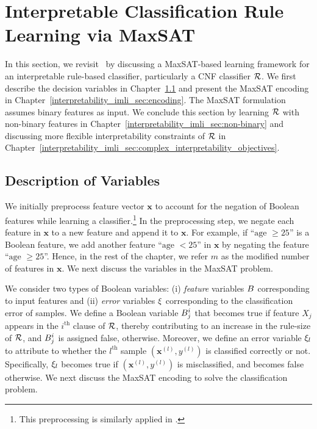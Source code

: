 \section{Interpretable Classification Rule Learning via MaxSAT}
\label{interpretability_imli_sec:baseline}
In this section, we revisit~\cite{malioutov2018mlic} by discussing a MaxSAT-based learning framework for an interpretable rule-based classifier, particularly a CNF classifier $ {\mathcal{R}} $. 
We first describe the decision variables in Chapter~\ref{interpretability_imli_sec:variables} and present the MaxSAT encoding  in Chapter~\ref{interpretability_imli_sec:encoding}. The MaxSAT formulation assumes binary features as input. We
conclude this section by learning $ {\mathcal{R}} $ with non-binary features in Chapter~\ref{interpretability_imli_sec:non-binary} and discussing more flexible interpretability constraints of $ {\mathcal{R}} $ in Chapter~\ref{interpretability_imli_sec:complex_interpretability_objectives}.  



\subsection{Description of Variables}
\label{interpretability_imli_sec:variables} 
We initially preprocess feature vector $ \mathbf{x} $  to account for the negation of  Boolean features while learning a classifier.\footnote{This preprocessing is similarly applied in  \cite{malioutov2013exact}.} In the preprocessing step, we negate each feature in $ \mathbf{x} $ to a new feature and append it to $ \mathbf{x} $. For example, if ``$ \text{age }\ge 25 $'' is a Boolean feature, we add another feature ``$ \text{age }< 25 $'' in  $ \mathbf{x} $ by negating the feature ``$ \text{age }\ge 25 $''. Hence, in the rest of the chapter, we refer $ m $ as the modified number of features in $ \mathbf{x} $. We next discuss the variables in the MaxSAT problem. 

We consider two types of Boolean variables: (i) \emph{feature} variables $ B $ corresponding to input features and (ii) \emph{error} variables $ \xi $ corresponding to the classification error of samples. We define a Boolean variable $ B^i_j $ that becomes true if feature $ X_j $ appears in the $ i^\text{th} $ clause of $ {\mathcal{R}} $, thereby contributing to an increase in the rule-size of $ {\mathcal{R}} $, and $ B^i_j $ is assigned false, otherwise. Moreover, we define an error variable $ \xi_l $ to attribute to whether the $ l^\text{th} $ sample $ (\mathbf{x}^{(l)}, y^{(l)}) $ is classified correctly or not. Specifically, $ \xi_l $ becomes true if $ (\mathbf{x}^{(l)}, y^{(l)}) $ is misclassified, and becomes false otherwise.  We next discuss the MaxSAT encoding to solve the classification problem.   




